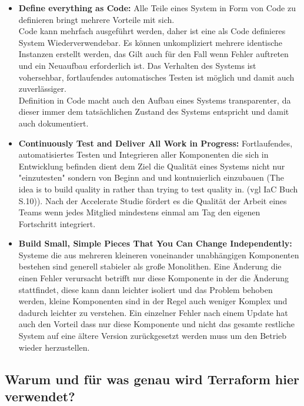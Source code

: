 \begin{itemize} 
  \item \textbf{Define everything as Code:} Alle Teile eines System
  in Form von Code zu definieren bringt mehrere Vorteile mit sich.\\
  Code kann mehrfach ausgeführt werden, daher ist eine als Code
  definieres System Wiederverwendebar. Es können unkompliziert mehrere
  identische Instanzen erstellt werden, das Gilt auch für den Fall
  wenn Fehler auftreten und ein Neuaufbau erforderlich ist.
  Das Verhalten des Systems ist vohersehbar, fortlaufendes automatisches
  Testen ist möglich und damit auch zuverlässiger.\\
  Definition in Code macht auch den Aufbau eines Systems transparenter,
  da dieser immer dem tatsächlichen Zustand des Systems entspricht und
  damit auch dokumentiert.
  
  \item \textbf{Continuously Test and Deliver All Work in Progress:} 
  Fortlaufendes, automatisiertes Testen und Integrieren aller Komponenten
  die sich in Entwicklung befinden dient dem Ziel die Qualität eines
  Systems nicht nur "einzutesten" sondern von Beginn and und kontnuierlich
  einzubauen
  (The idea is to build quality in rather than trying to test quality in.
  (vgl IaC Buch S.10)). Nach der Accelerate Studie fördert es die Qualität
  der Arbeit eines Teams wenn jedes Mitglied mindestens einmal am Tag den
  eigenen Fortschritt integriert.

  \item \textbf{Build Small, Simple Pieces That You Can Change Independently:} 
  Systeme die aus mehreren kleineren voneinander unabhängigen Komponenten
  bestehen sind generell stabieler als große Monolithen. Eine Änderung die
  einen Fehler verursacht betrifft nur diese Komponente in der die Änderung
  stattfindet, diese kann dann leichter isoliert und das Problem behoben
  werden, kleine Komponenten sind in der Regel auch weniger Komplex und
  dadurch leichter zu verstehen. Ein einzelner Fehler nach einem Update
  hat auch den Vorteil dass nur diese Komponente und nicht das gesamte
  restliche System auf eine ältere Version zurückgesetzt werden muss um
  den Betrieb wieder herzustellen.

\end{itemize}

\subsection{Warum und für was genau wird Terraform hier verwendet?}

